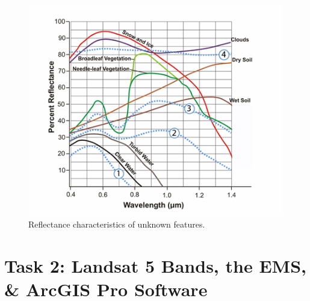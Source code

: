 \documentclass[
]{book}
\begin{document}
\begin{figure}

{\centering \includegraphics[width=0.8\linewidth]{images/01-reflectance-characteristics-unknown-features} 

}

\caption{Reflectance characteristics of unknown features.}\label{fig:01-reflectance-characteristics-unknown-features}
\end{figure}

\hypertarget{task-2-landsat-5-bands-the-ems-arcgis-pro-software}{%
\section*{Task 2: Landsat 5 Bands, the EMS, \& ArcGIS Pro Software}\label{task-2-landsat-5-bands-the-ems-arcgis-pro-software}}
\end{document}
